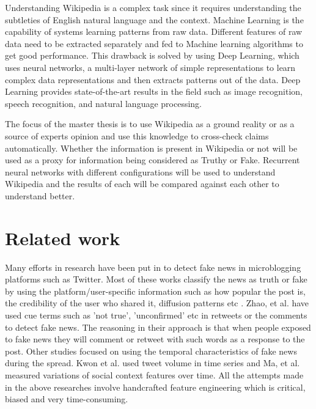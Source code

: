 \documentclass[a4paper, 11pt]{article}
\begin{document}
Understanding Wikipedia is a complex task since it requires understanding the subtleties of English natural language and the context. Machine Learning is the capability of systems learning patterns from raw data. Different features of raw data need to be extracted separately and fed to Machine learning algorithms to get good performance. This drawback is solved by using Deep Learning, which uses neural networks, a multi-layer network of simple representations to learn complex data representations and then extracts patterns out of the data\cite{Goodfellow2016}. Deep Learning provides state-of-the-art results in the field such as image recognition, speech recognition, and natural language processing.

The focus of the master thesis is to use Wikipedia as a ground reality or as a source of experts opinion and use this knowledge to cross-check claims automatically. Whether the information is present in Wikipedia or not will be used as a proxy for information being considered as Truthy or Fake. Recurrent neural networks with different configurations will be used to understand Wikipedia and the results of each will be compared against each other to understand better.

\section{Related work}


Many efforts in research have been put in to detect fake news in microblogging platforms such as Twitter. Most of these works classify the news as truth or fake by using the platform/user-specific information such as how popular the post is, the credibility of the user who shared it, diffusion patterns etc \cite{Liu2015} \cite{Ma2015}. Zhao, et al. \cite{Zhao2015} have used cue terms such as 'not true', 'unconfirmed' etc in retweets or the comments to detect fake news. The reasoning in their approach is that when people exposed to fake news they will comment or retweet with such words as a response to the post. Other studies focused on using the temporal characteristics of fake news during the spread. Kwon et al.\cite{Kwon2013} used tweet volume in time series and Ma, et al.\cite{Ma2015} measured variations of social context features over time. All the attempts made in the above researches involve handcrafted feature engineering which is critical, biased and very time-consuming.
\end{document}
